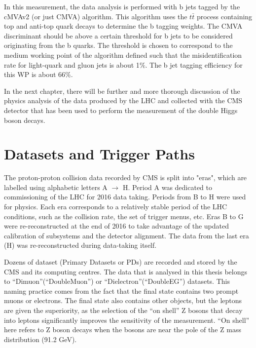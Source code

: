 In this measurement, the data analysis is performed with b jets tagged by the cMVAv2 (or just CMVA) algorithm. This algorithm uses the $t\bar{t}$ process containing top and anti-top quark decays to determine the b tagging weights. The CMVA discriminant should be above a certain threshold for b jets to be considered originating from the b quarks. The threshold is chosen to correspond to the medium working point of the algorithm defined such that the misidentification rate for light-quark and gluon jets is about 1$\%$.  The b jet tagging efficiency for this WP is about 66$\%$.

In the next chapter, there will be further and more thorough discussion of the physics analysis of the data produced by the LHC and collected with the CMS detector that has been used to perform the measurement of the double Higgs boson decays.


\section{Datasets and Trigger Paths}\label{sec:data_and_trigger}

The proton-proton collision data recorded by CMS is split into "eras", which are labelled using alphabetic letters A $\rightarrow $ H. Period A was dedicated to commissioning of the LHC for 2016 data taking. Periods from B to H were used for physics. Each era corresponds to a relatively stable period of the LHC conditions, such as the collision rate, the set of trigger menus, etc. Eras B to G were re-reconstructed at the end of 2016 to take advantage of the updated calibration of subsystems and the detector alignment. The data from the last era (H) was re-reconstructed during data-taking itself. 

Dozens of dataset (Primary Datasets or PDs) are recorded and stored by the CMS and its computing centres. The data that is analysed in this thesis belongs to ``Dimuon''(``DoubleMuon'') or ``Dielectron''(``DoubleEG'') datasets. This naming practice comes from the fact that the final state contains two prompt muons or electrons. The final state also contains other objects, but the leptons are given the superiority, as the selection of the ``on shell'' Z bosons that decay into leptons significantly improves the sensitivity of the measurement. ``On shell'' here refers to Z boson decays when the bosons are near the pole of the Z mass distribution (91.2 GeV). 

